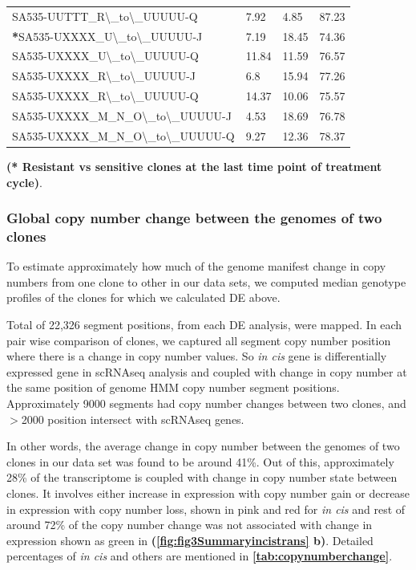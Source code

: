 \begin{table}[htbp]
\begin{tabular}{|l|l|l|l|}
     SA535-UUTTT\_R\textbackslash{}\_to\textbackslash{}\_UUUUU-Q & 7.92 & 4.85 & 87.23 \\
     \textbf{*}SA535-UXXXX\_U\textbackslash{}\_to\textbackslash{}\_UUUUU-J & 7.19 & 18.45 & 74.36 \\
     SA535-UXXXX\_U\textbackslash{}\_to\textbackslash{}\_UUUUU-Q & 11.84 & 11.59 & 76.57 \\
     SA535-UXXXX\_R\textbackslash{}\_to\textbackslash{}\_UUUUU-J & 6.8 & 15.94 & 77.26 \\
     SA535-UXXXX\_R\textbackslash{}\_to\textbackslash{}\_UUUUU-Q & 14.37 & 10.06 & 75.57 \\
     SA535-UXXXX\_M\_N\_O\textbackslash{}\_to\textbackslash{}\_UUUUU-J & 4.53 & 18.69 & 76.78 \\
     SA535-UXXXX\_M\_N\_O\textbackslash{}\_to\textbackslash{}\_UUUUU-Q & 9.27 & 12.36 & 78.37 \\
   \hline 
 \end{tabular}%
\label{tab:copynumberchange}%

  \small\textbf{(* Resistant vs sensitive clones at the last time point of treatment cycle)}.
\end{table}%


\subsubsection{Global copy number change between the genomes of two clones}

To estimate approximately how much of the genome manifest change in copy numbers from one clone to other in our data sets, we computed median genotype profiles of the clones for which we calculated \ac{DE} above.

Total of 22,326 segment positions, from each DE analysis, were mapped. In each pair wise comparison of clones, we captured all segment copy number position where there is a change in copy number values. So \textit{in cis} gene is differentially expressed gene in scRNAseq analysis and coupled with change in copy number at the same position of genome HMM copy number segment positions. Approximately 9000 segments had copy number changes between two clones, and $>$2000 position intersect with scRNAseq genes.

In other words, the average change in copy number between the genomes of two clones in our data set was found to be around 41\%. Out of this, approximately 28\% of the transcriptome is coupled with change in copy number state between clones. It involves either increase in expression with copy number gain or decrease in expression with copy number loss, shown in pink and red for \textit{in cis} and rest of  around 72\% of the copy number change was not associated with change in expression shown as green in \textbf{(\autoref{fig:fig3Summaryincistrans} b)}. Detailed percentages of \textit{in cis} and others are mentioned in 
\textbf{\autoref{tab:copynumberchange}}.

